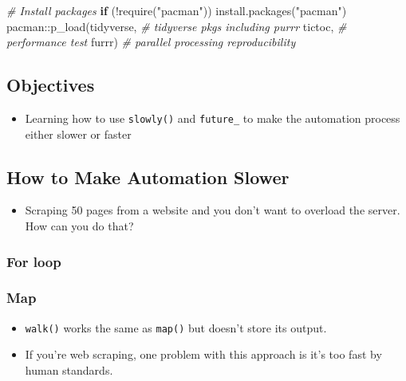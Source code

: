 \documentclass[
]{book}
\newenvironment{Shaded}{\begin{snugshade}}{\end{snugshade}}
\newcommand{\CommentTok}[1]{\textcolor[rgb]{0.56,0.35,0.01}{\textit{#1}}}
\newcommand{\ControlFlowTok}[1]{\textcolor[rgb]{0.13,0.29,0.53}{\textbf{#1}}}
\newcommand{\FunctionTok}[1]{\textcolor[rgb]{0.00,0.00,0.00}{#1}}
\newcommand{\NormalTok}[1]{#1}
\newcommand{\SpecialCharTok}[1]{\textcolor[rgb]{0.00,0.00,0.00}{#1}}
\newcommand{\StringTok}[1]{\textcolor[rgb]{0.31,0.60,0.02}{#1}}
\providecommand{\tightlist}{%
  \setlength{\itemsep}{0pt}\setlength{\parskip}{0pt}}
\begin{document}
\begin{Shaded}
\begin{Highlighting}[]
\CommentTok{\# Install packages }
\ControlFlowTok{if}\NormalTok{ (}\SpecialCharTok{!}\FunctionTok{require}\NormalTok{(}\StringTok{"pacman"}\NormalTok{)) }\FunctionTok{install.packages}\NormalTok{(}\StringTok{"pacman"}\NormalTok{)}
\NormalTok{pacman}\SpecialCharTok{::}\FunctionTok{p\_load}\NormalTok{(tidyverse, }\CommentTok{\# tidyverse pkgs including purrr}
\NormalTok{               tictoc, }\CommentTok{\# performance test }
\NormalTok{               furrr) }\CommentTok{\# parallel processing  reproducibility }
\end{Highlighting}
\end{Shaded}

\hypertarget{objectives-2}{%
\subsection{Objectives}\label{objectives-2}}

\begin{itemize}
\tightlist
\item
  Learning how to use \texttt{slowly()} and \texttt{future\_} to make the automation process either slower or faster
\end{itemize}

\hypertarget{how-to-make-automation-slower}{%
\subsection{How to Make Automation Slower}\label{how-to-make-automation-slower}}

\begin{itemize}
\tightlist
\item
  Scraping 50 pages from a website and you don't want to overload the server. How can you do that?
\end{itemize}

\hypertarget{for-loop-2}{%
\subsubsection{For loop}\label{for-loop-2}}

\hypertarget{map}{%
\subsubsection{Map}\label{map}}

\begin{itemize}
\item
  \texttt{walk()} works the same as \texttt{map()} but doesn't store its output.
\item
  If you're web scraping, one problem with this approach is it's too fast by human standards.
\end{itemize}
\end{document}
